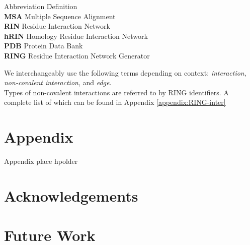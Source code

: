 \documentclass[11pt]{article} %
\begin{document}
\begin{tabbing}
	Abbreviation \hspace{2cm} \= Definition \\
	\textbf{MSA} \> Multiple Sequence Alignment \\
	\textbf{RIN} \> Residue Interaction Network \\
	\textbf{hRIN} \> Homology Residue Interaction Network \\
	\textbf{PDB} \> Protein Data Bank \\
	\textbf{RING} \> Residue Interaction Network Generator \cite{ring}\\
\end{tabbing}
We interchangeably use the following terms depending on context: \emph{interaction}, \emph{non-covalent interaction}, and \emph{edge}.\\
Types of non-covalent interactions are referred to by RING identifiers. A complete list of which can be found in Appendix  \ref{appendix:RING-inter}\\







\appendix
\section*{Appendix}  %

Appendix place hpolder

\section{Acknowledgements}

\section{Future Work}

\newpage

\end{document}
